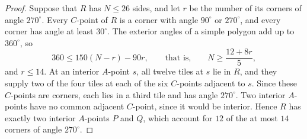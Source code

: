 \documentclass[11pt,a4paper]{article}
\theoremstyle{plain}
\theoremstyle{definition}
\theoremstyle{remark}
\newcommand{\dg}{^\circ}
\numberwithin{equation}{section}
\begin{document}
\begin{proof}
Suppose that $R$ has $N\le26$ sides, and let $r$ be the number of its corners of angle $270\dg$. Every $C$-point of $R$ is a corner with angle $90\dg$ or $270\dg$, and every corner has angle at least $30\dg$. The exterior angles of a simple polygon add up to $360\dg$, so
\[
360\le150(N-r)-90r,\qquad\text{that is,}\qquad N\ge\frac{12+8r}{5},
\]
and $r\le14$. At an interior $A$-point $s$, all twelve tiles at $s$ lie in $R$, and they supply two of the four tiles at each of the six $C$-points adjacent to $s$. Since these $C$-points are corners, each lies in a third tile and has angle $270\dg$. Two interior $A$-points have no common adjacent $C$-point, since it would be interior. Hence $R$ has exactly two interior $A$-points $P$ and $Q$, which account for $12$ of the at most $14$ corners of angle $270\dg$.


\end{proof}
\end{document}
